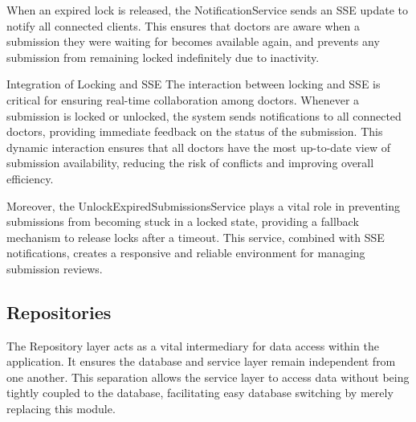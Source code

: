 When an expired lock is released, the NotificationService sends an SSE update to notify all connected clients. This ensures that doctors are aware when a submission they were waiting for becomes available again, and prevents any submission from remaining locked indefinitely due to inactivity.

Integration of Locking and SSE
The interaction between locking and SSE is critical for ensuring real-time collaboration among doctors. Whenever a submission is locked or unlocked, the system sends notifications to all connected doctors, providing immediate feedback on the status of the submission. This dynamic interaction ensures that all doctors have the most up-to-date view of submission availability, reducing the risk of conflicts and improving overall efficiency.

Moreover, the UnlockExpiredSubmissionsService plays a vital role in preventing submissions from becoming stuck in a locked state, providing a fallback mechanism to release locks after a timeout. This service, combined with SSE notifications, creates a responsive and reliable environment for managing submission reviews.
%
%
\newpage
\subsection{Repositories}

The Repository layer acts as a vital intermediary for data access within the application. It ensures the database and service layer remain independent from one another. This separation allows the service layer to access data without being tightly coupled to the database, facilitating easy database switching by merely replacing this module.

